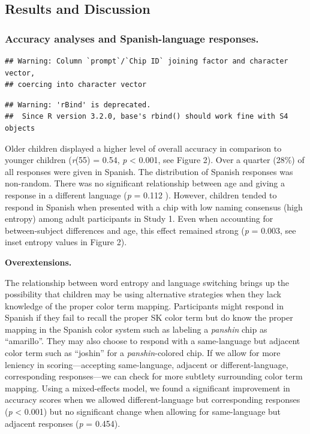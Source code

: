 \documentclass[man]{apa6}
\theoremstyle{definition}
\theoremstyle{definition}
\theoremstyle{definition}
\theoremstyle{remark}
\begin{document}
\subsection{Results and Discussion}\label{results-and-discussion-1}

\subsubsection{Accuracy analyses and Spanish-language
responses.}\label{accuracy-analyses-and-spanish-language-responses.}

\begin{verbatim}
## Warning: Column `prompt`/`Chip ID` joining factor and character vector,
## coercing into character vector
\end{verbatim}

\begin{verbatim}
## Warning: 'rBind' is deprecated.
##  Since R version 3.2.0, base's rbind() should work fine with S4 objects
\end{verbatim}

Older children displayed a higher level of overall accuracy in
comparison to younger children (\emph{r}(55) = 0.54, \emph{p}
\textless{} 0.001, see Figure 2). Over a quarter (28\%) of all responses
were given in Spanish. The distribution of Spanish responses was
non-random. There was no significant relationship between age and giving
a response in a different language (\emph{p} = 0.112 ). However,
children tended to respond in Spanish when presented with a chip with
low naming consensus (high entropy) among adult participants in Study 1.
Even when accounting for between-subject differences and age, this
effect remained strong (\emph{p} = 0.003, see inset entropy values in
Figure 2).

\textbf{Overextensions.}

The relationship between word entropy and language switching brings up
the possibility that children may be using alternative strategies when
they lack knowledge of the proper color term mapping. Participants might
respond in Spanish if they fail to recall the proper SK color term but
do know the proper mapping in the Spanish color system such as labeling
a \emph{panshin} chip as \enquote{amarillo}. They may also choose to
respond with a same-language but adjacent color term such as
\enquote{joshin} for a \emph{panshin}-colored chip. If we allow for more
leniency in scoring---accepting same-language, adjacent or
different-language, corresponding responses---we can check for more
subtlety surrounding color term mapping. Using a mixed-effects model, we
found a significant improvement in accuracy scores when we allowed
different-language but corresponding responses (\emph{p} \textless{}
0.001) but no significant change when allowing for same-language but
adjacent responses (\emph{p} = 0.454).
\end{document}
